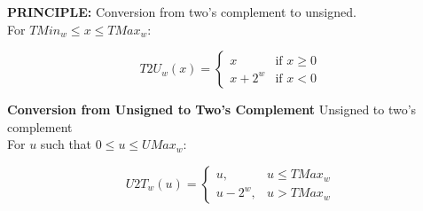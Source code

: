 \documentclass{article}
\begin{document}
\maketitle

    \begin{flushleft}
        \textbf{\small PRINCIPLE:} Conversion from two's complement to unsigned.\\
        For $TMin_w \leq x \leq TMax_w$:

        \[
        T2U_w(x) = \begin{cases} x & \text{if } x \geq 0 \\ x + 2^w & \text{if } x < 0 \end{cases}
        \]
    \end{flushleft}
    \smallskip
        \textbf{\small Conversion from Unsigned to Two's Complement} Unsigned to two's complement\\
        For $u$ such that $0 \leq u \leq UMax_w:$

        \[
            U2T_w(u) = \begin{cases} u, & u \leq TMax_w \\ 
            u - 2 ^w, & u > TMax_w\end{cases}
        \]
\end{document}
